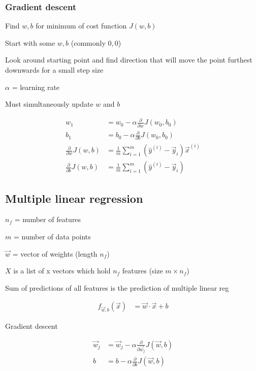 \documentclass[12pt]{article}
\begin{document}
\subsubsection{Gradient descent}

Find $w,b$ for minimum of cost function $J(w,b)$

\begin{myenumerate}
	\item Start with some $w,b$ (commonly $0,0$)
	\item Look around starting point and find direction that will move the point furthest downwards for a small step size
\end{myenumerate}

$\alpha$ = learning rate

Must simultaneously update $w$ and $b$

\begin{align*}
    w_1 &= w_0 - \alpha \frac{\partial}{\partial w} J(w_0,b_0)\\
    b_1 &= b_0 - \alpha \frac{\partial}{\partial b} J(w_0,b_0)\\
    \frac{\partial}{\partial w} J(w,b) &= \frac{1}{m} \sum_{i=1}^m ({\hat y}^{(i)} - \vec{y}_i) \vec{x}^{(i)}\\
    \frac{\partial}{\partial b} J(w,b) &= \frac{1}{m} \sum_{i=1}^m ({\hat y}^{(i)} - \vec{y}_i)
\end{align*}

\subsection{Multiple linear regression}

$n_f$ = number of features

$m$ = number of data points

$\vec{w}$ = vector of weights (length $n_f$)

$X$ is a list of x vectors which hold $n_f$ features (size $m \times n_f$)

Sum of predictions of all features is the prediction of multiple linear reg

\begin{align*}
    f_{\vec{w},b}(\vec{x}) &= \vec{w} \cdot \vec{x} + b
\end{align*}

Gradient descent

\begin{align*}
    \vec{w}_j &= \vec{w}_j - \alpha \frac{\partial}{\partial \vec{w}_j} J(\vec{w},b)\\
    b &= b - \alpha \frac{\partial}{\partial b} J(\vec{w},b)
\end{align*}
\end{document}
